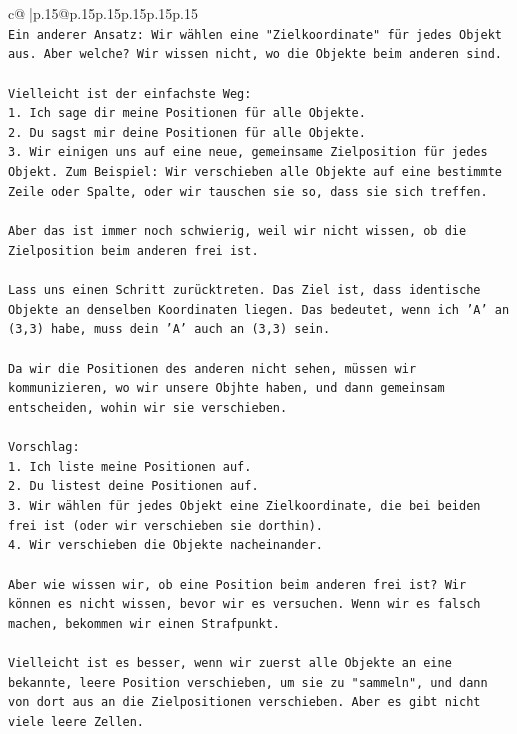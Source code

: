 \documentclass{article}
\begin{document}
{\begin{supertabular}{c@{$\;$}|p{.15\linewidth}@{}p{.15\linewidth}p{.15\linewidth}p{.15\linewidth}p{.15\linewidth}p{.15\linewidth}}
{{{\\ 
\texttt{Ein anderer Ansatz: Wir wählen eine "Zielkoordinate" für jedes Objekt aus. Aber welche? Wir wissen nicht, wo die Objekte beim anderen sind.} \\
\\ 
\texttt{Vielleicht ist der einfachste Weg:} \\
\texttt{1. Ich sage dir meine Positionen für alle Objekte.} \\
\texttt{2. Du sagst mir deine Positionen für alle Objekte.} \\
\texttt{3. Wir einigen uns auf eine neue, gemeinsame Zielposition für jedes Objekt. Zum Beispiel: Wir verschieben alle Objekte auf eine bestimmte Zeile oder Spalte, oder wir tauschen sie so, dass sie sich treffen.} \\
\\ 
\texttt{Aber das ist immer noch schwierig, weil wir nicht wissen, ob die Zielposition beim anderen frei ist.} \\
\\ 
\texttt{Lass uns einen Schritt zurücktreten. Das Ziel ist, dass identische Objekte an denselben Koordinaten liegen. Das bedeutet, wenn ich 'A' an (3,3) habe, muss dein 'A' auch an (3,3) sein.} \\
\\ 
\texttt{Da wir die Positionen des anderen nicht sehen, müssen wir kommunizieren, wo wir unsere Objhte haben, und dann gemeinsam entscheiden, wohin wir sie verschieben.} \\
\\ 
\texttt{Vorschlag:} \\
\texttt{1. Ich liste meine Positionen auf.} \\
\texttt{2. Du listest deine Positionen auf.} \\
\texttt{3. Wir wählen für jedes Objekt eine Zielkoordinate, die bei beiden frei ist (oder wir verschieben sie dorthin).} \\
\texttt{4. Wir verschieben die Objekte nacheinander.} \\
\\ 
\texttt{Aber wie wissen wir, ob eine Position beim anderen frei ist? Wir können es nicht wissen, bevor wir es versuchen. Wenn wir es falsch machen, bekommen wir einen Strafpunkt.} \\
\\ 
\texttt{Vielleicht ist es besser, wenn wir zuerst alle Objekte an eine bekannte, leere Position verschieben, um sie zu "sammeln", und dann von dort aus an die Zielpositionen verschieben. Aber es gibt nicht viele leere Zellen.} \\
}}}
\end{supertabular}}
\end{document}
